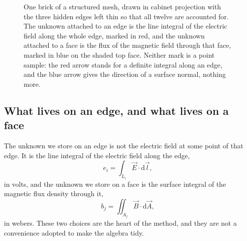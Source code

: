 \begin{figure}[htbp]
\centering
{}
\caption{One brick of a structured mesh, drawn in cabinet projection with the three hidden edges left thin so
that all twelve are accounted for. The unknown attached to an edge is the line integral of the electric field
along the whole edge, marked in red, and the unknown attached to a face is the flux of the magnetic field
through that face, marked in blue on the shaded top face. Neither mark is a point sample: the red arrow stands
for a definite integral along an edge, and the blue arrow gives the direction of a surface normal, nothing
more.}
\label{fig:hiw:brick}
\end{figure}

\subsection{What lives on an edge, and what lives on a face}\label{sec:hiw:dofs}

The unknown we store on an edge is not the electric field at some point of that edge. It is the line integral of
the electric field along the edge,
\begin{equation}
  e_i = \int_{L_i} \vec E \cdot \mathrm{d}\vec l ,
  \label{eq:hiw-e}
\end{equation}
in volts, and the unknown we store on a face is the surface integral of the magnetic flux density through it,
\begin{equation}
  b_j = \iint_{A_j} \vec B \cdot \mathrm{d}\vec A ,
  \label{eq:hiw-b}
\end{equation}
in webers. These two choices are the heart of the method, and they are not a convenience adopted to make the
algebra tidy.

